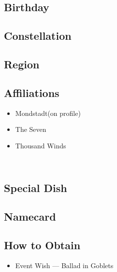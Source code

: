 \documentclass[a4paper,12pt]{article}
\begin{document}
\subsection*{Birthday}\n\n\subsection*{Constel­lation}\n\n\subsection*{Region}\n\n\subsection*{Affil­i­a­tions}\n\n\begin{itemize}
\item Mondstadt(on profile)
\item The Seven
\item Thousand Winds
\end{itemize}\\ \par \vspace{0.5cm}

\subsection*{Special Dish}\n\n\subsection*{Namecard}\n\n\subsection*{How to Obtain}\n\n\begin{itemize}
\item Event Wish — Ballad in Goblets
\end{itemize}\\ \par \vspace{0.5cm}
\end{document}
